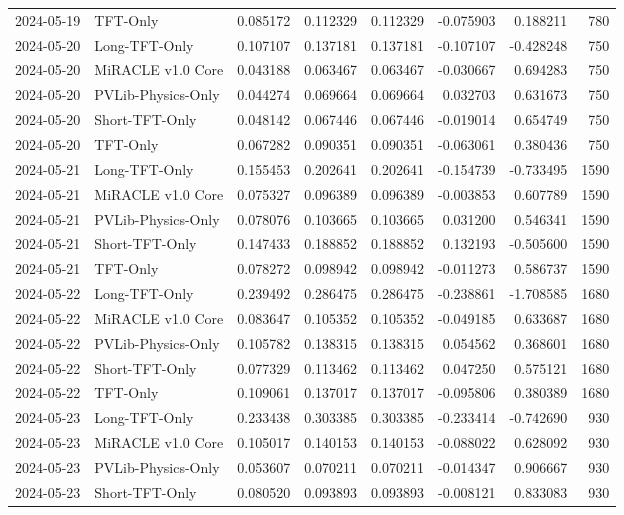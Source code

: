 \begin{tabular}{llrrrrrr}
2024-05-19 & TFT-Only & 0.085172 & 0.112329 & 0.112329 & -0.075903 & 0.188211 & 780 \\
2024-05-20 & Long-TFT-Only & 0.107107 & 0.137181 & 0.137181 & -0.107107 & -0.428248 & 750 \\
2024-05-20 & MiRACLE v1.0 Core & 0.043188 & 0.063467 & 0.063467 & -0.030667 & 0.694283 & 750 \\
2024-05-20 & PVLib-Physics-Only & 0.044274 & 0.069664 & 0.069664 & 0.032703 & 0.631673 & 750 \\
2024-05-20 & Short-TFT-Only & 0.048142 & 0.067446 & 0.067446 & -0.019014 & 0.654749 & 750 \\
2024-05-20 & TFT-Only & 0.067282 & 0.090351 & 0.090351 & -0.063061 & 0.380436 & 750 \\
2024-05-21 & Long-TFT-Only & 0.155453 & 0.202641 & 0.202641 & -0.154739 & -0.733495 & 1590 \\
2024-05-21 & MiRACLE v1.0 Core & 0.075327 & 0.096389 & 0.096389 & -0.003853 & 0.607789 & 1590 \\
2024-05-21 & PVLib-Physics-Only & 0.078076 & 0.103665 & 0.103665 & 0.031200 & 0.546341 & 1590 \\
2024-05-21 & Short-TFT-Only & 0.147433 & 0.188852 & 0.188852 & 0.132193 & -0.505600 & 1590 \\
2024-05-21 & TFT-Only & 0.078272 & 0.098942 & 0.098942 & -0.011273 & 0.586737 & 1590 \\
2024-05-22 & Long-TFT-Only & 0.239492 & 0.286475 & 0.286475 & -0.238861 & -1.708585 & 1680 \\
2024-05-22 & MiRACLE v1.0 Core & 0.083647 & 0.105352 & 0.105352 & -0.049185 & 0.633687 & 1680 \\
2024-05-22 & PVLib-Physics-Only & 0.105782 & 0.138315 & 0.138315 & 0.054562 & 0.368601 & 1680 \\
2024-05-22 & Short-TFT-Only & 0.077329 & 0.113462 & 0.113462 & 0.047250 & 0.575121 & 1680 \\
2024-05-22 & TFT-Only & 0.109061 & 0.137017 & 0.137017 & -0.095806 & 0.380389 & 1680 \\
2024-05-23 & Long-TFT-Only & 0.233438 & 0.303385 & 0.303385 & -0.233414 & -0.742690 & 930 \\
2024-05-23 & MiRACLE v1.0 Core & 0.105017 & 0.140153 & 0.140153 & -0.088022 & 0.628092 & 930 \\
2024-05-23 & PVLib-Physics-Only & 0.053607 & 0.070211 & 0.070211 & -0.014347 & 0.906667 & 930 \\
2024-05-23 & Short-TFT-Only & 0.080520 & 0.093893 & 0.093893 & -0.008121 & 0.833083 & 930 \\

\end{tabular}
